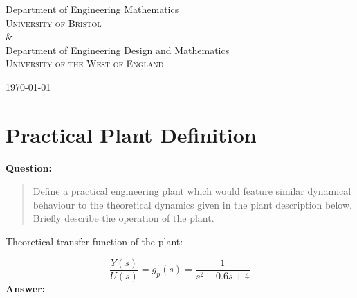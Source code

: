 \documentclass[12pt, oneside]{article}
\begin{document}
\begin{titlepage}
\begin{center}
        \vspace{10mm}
        {\large Department of Engineering Mathematics\\
        \textsc{University of Bristol}}
        \\
        \&
        \\
        {\large Department of Engineering Design and Mathematics\\
        \textsc{University of the West of England}}\\

        \vspace{0.8cm}
 
        \vspace{0.8cm}
        \today
        
    \end{center}
    
\end{titlepage}

\tableofcontents
\pagebreak

\section{Practical Plant Definition}



\textbf{Question:} 
\begin{quote}
Define a practical engineering plant which would feature similar dynamical behaviour to the theoretical dynamics given in the plant description below. Briefly describe the operation of the plant.
\end{quote}

Theoretical transfer function of the plant:

\begin{equation}
    \frac{Y(s)}{U(s)} = g_{p}(s) = \frac{1}{s^{2}+0.6s+4}
\end{equation}
\textbf{Answer:}
\vspace{0.5cm}
\end{document}

